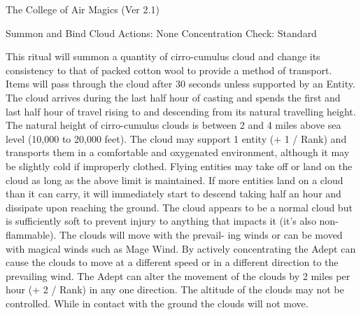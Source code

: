 \begin{Chapter}{The College of Air Magics (Ver 2.1)}
\begin{ritual}[R-4]{Summon and Bind Cloud }
Actions: None 
Concentration Check: Standard 
\begin{effects}
 This  ritual  will  summon  a  quantity  of 
cirro-cumulus  cloud  and  change  its  consistency  to 
that of packed cotton wool to provide a method of 
transport.  Items  will  pass  through  the  cloud  after 
30  seconds  unless  supported  by  an  Entity.  The 
cloud  arrives  during  the  last  half  hour  of  casting 
and  spends  the  first  and  last  half  hour  of  travel 
rising to and descending from its natural travelling 
height.  The  natural height  of  cirro-cumulus clouds 
is between 2 and 4 miles above sea level (10,000 to 
20,000 feet). The cloud may support 1 entity (+ 1 / 
Rank)  and  transports  them  in  a  comfortable  and 
oxygenated  environment,  although  it  may  be 
slightly  cold  if  improperly  clothed.  Flying  entities 
may  take  off  or  land  on  the  cloud  as  long  as  the 
above limit is maintained. If more entities land on a 
cloud than it can carry, it will immediately start to 
descend  taking  half  an  hour  and  dissipate  upon 
reaching  the  ground.  The  cloud  appears  to  be  a 
normal  cloud  but  is  sufficiently  soft  to  prevent 
injury  to  anything  that  impacts  it  (it’s  also  non-
flammable). The clouds will move with the prevail-
ing  winds  or  can  be  moved  with  magical  winds 
such as Mage Wind. By actively concentrating the 
Adept  can  cause  the  clouds  to  move  at  a  different 
speed  or  in  a  different  direction  to  the  prevailing 
wind.  The  Adept  can  alter  the  movement  of  the 
clouds by 2 miles per hour (+ 2 / Rank) in any one 
direction.  The  altitude  of  the  clouds  may  not  be 
controlled.  While  in  contact  with  the  ground  the 
clouds will not move.  
\end{effects}
\end{ritual}

\begin{table*}

\end{table*}
\end{Chapter}
